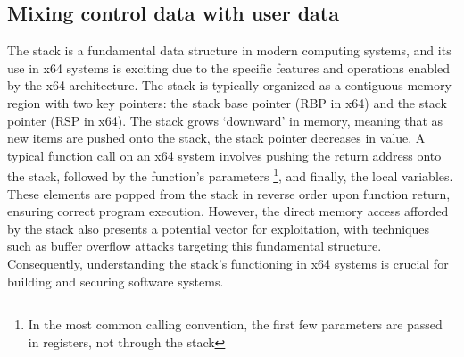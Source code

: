 \documentclass{article}
\begin{document}
\subsection{Mixing control data with user data}
The stack is a fundamental data structure in modern computing systems, and its use in x64 systems is exciting due to the specific features and operations enabled by the x64 architecture. The stack is typically organized as a contiguous memory region with two key pointers: the stack base pointer (RBP in x64) and the stack pointer (RSP in x64). The stack grows `downward' in memory, meaning that as new items are pushed onto the stack, the stack pointer decreases in value. A typical function call on an x64 system involves pushing the return address onto the stack, followed by the function's parameters \footnote{In the most common calling convention, the first few parameters are passed in registers, not through the stack}, and finally, the local variables. These elements are popped from the stack in reverse order upon function return, ensuring correct program execution. However, the direct memory access afforded by the stack also presents a potential vector for exploitation, with techniques such as buffer overflow attacks targeting this fundamental structure. Consequently, understanding the stack's functioning in x64 systems is crucial for building and securing software systems.
\end{document}

